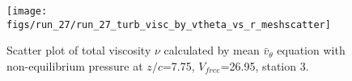 \begin{figure}[H]
\centering
\texttt{[image: figs/run\_27/run\_27\_turb\_visc\_by\_vtheta\_vs\_r\_meshscatter]}
\caption{Scatter plot of total viscosity $\nu$ calculated by mean $\bar{v}_{\theta}$ equation with non-equilibrium pressure at $z/c$=7.75, $V_{free}$=26.95, station 3.}
\label{fig:run_27_turb_visc_by_vtheta_vs_r_meshscatter}
\end{figure}


